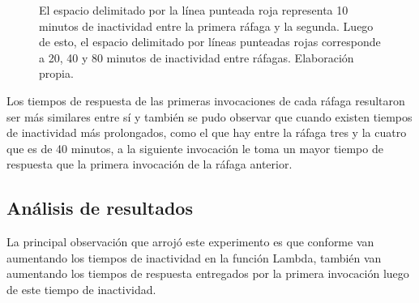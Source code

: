 \begin{figure}[h]
\hspace{-1.5cm}
\caption[\hspace{0.2cm} 4 ráfagas de 100 invocaciones de redimensionamiento en imágenes $1Mb \leq x \leq 2Mb$]{El espacio delimitado por la línea punteada roja representa 10 minutos de inactividad entre la primera ráfaga y la segunda. Luego de esto, el espacio delimitado por líneas punteadas rojas corresponde a 20, 40 y 80 minutos de inactividad entre ráfagas. Elaboración propia.}
\label{fig:rafagas-hasta-2mb}
\end{figure}

Los tiempos de respuesta de las primeras invocaciones de cada ráfaga resultaron ser más similares entre sí y también se pudo observar que cuando existen tiempos de inactividad más prolongados, como el que hay entre la ráfaga tres y la cuatro que es de 40 minutos, a la siguiente invocación le toma un mayor tiempo de respuesta que la primera invocación de la ráfaga anterior.

\subsection{Análisis de resultados}
La principal observación que arrojó este experimento es que conforme van aumentando los tiempos de inactividad en la función Lambda, también van aumentando los tiempos de respuesta entregados por la primera invocación luego de este tiempo de inactividad. 

